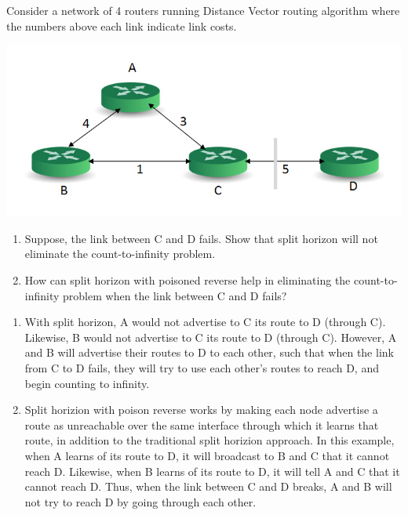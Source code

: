 \documentclass{report}
\begin{document}
\clearpage
\begin{problem}

Consider a network of 4 routers running Distance Vector routing algorithm where the numbers above each link indicate link costs.
\begin{center}
\includegraphics[scale=0.4]{hw7-q2.jpg}
\end{center}

\begin{enumerate}
\item Suppose, the link between C and D fails. Show that split horizon will not eliminate the count-to-infinity problem.
\item How can split horizon with poisoned reverse help in eliminating the count-to-infinity problem when the link between C and D fails?
\end{enumerate}

\begin{answer}{30em}
  \begin{enumerate}
    \item With split horizon, A would not advertise to C its route to D (through
      C). Likewise, B would not advertise to C its route to D (through C).
      However, A and B will advertise their routes to D to each other, such that
      when the link from C to D fails, they will try to use each other's routes
      to reach D, and begin counting to infinity.

    \item Split horizion with poison reverse works by making each node advertise
      a route as unreachable over the same interface through which it learns
      that route, in addition to the traditional split horizion approach. In
      this example, when A learns of its route to D, it will broadcast to B and
      C that it cannot reach D. Likewise, when B learns of its route to D,
      it will tell A and C that it cannot reach D. Thus, when the link between
      C and D breaks, A and B will not try to reach D by going through each
      other.
  \end{enumerate}

\end{answer}


\end{problem}
\end{document}
